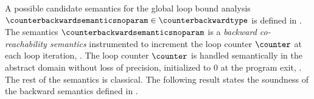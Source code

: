 A possible candidate semantics for the global loop bound analysis $\counterbackwardsemanticsnoparam\in\counterbackwardtype$ is defined in .
The semantics $\counterbackwardsemanticsnoparam$ is a \textit{backward co-reachability semantics} instrumented to increment the loop counter $\counter$ at each loop iteration, \cf{} .
The loop counter $\counter$ is handled semantically in the abstract domain without loss of precision, initialized to $0$ at the program exit, \cf{} .
The rest of the semantics is classical.
The following result states the soundness of the backward semantics defined in .
%

